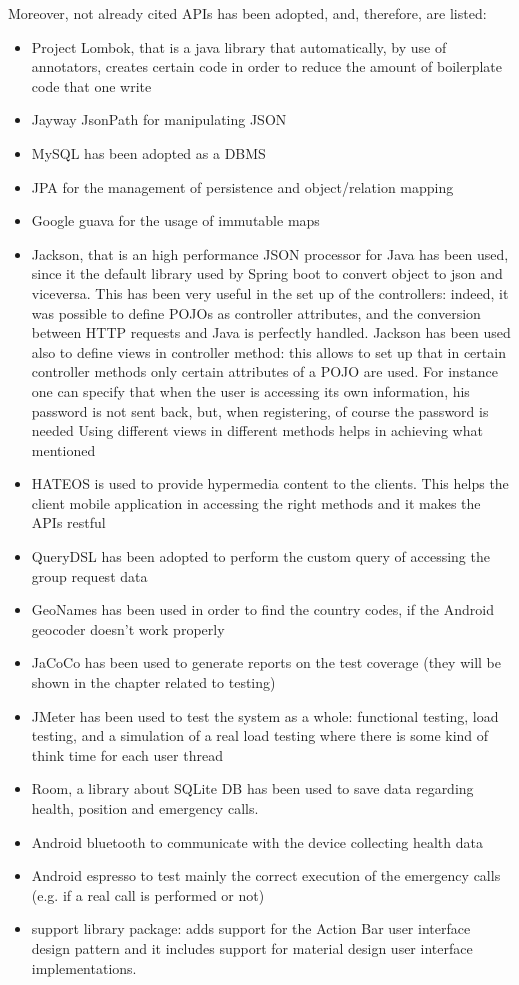 Moreover, not already cited APIs has been adopted, and, therefore, are listed: 

\begin{itemize}
\item Project Lombok, that is a java library that automatically, by use of annotators, creates certain code in order to reduce the amount
of boilerplate code that one write 
\item Jayway JsonPath for manipulating JSON 
\item MySQL has been adopted as a DBMS
\item JPA for the management of persistence and object/relation mapping
\item Google guava for the usage of immutable maps
\item Jackson, that is an high performance JSON processor for Java has been used, since it the default library used by Spring boot 
to convert object to json and viceversa. 
This has been very useful in the set up of the controllers: indeed, it was possible to define POJOs as controller attributes, and the conversion between HTTP requests and Java is perfectly handled. 
Jackson has been used also to define views in controller method: this allows to set up that in certain controller methods only certain attributes of a POJO are used. 
For instance one can specify that when the user is accessing its own information, his password is not sent back, but, when registering, of course the password is needed
Using different views in different methods helps in achieving what mentioned 
\item HATEOS is used to provide hypermedia content to the clients. This helps the client mobile application in accessing the right methods 
and it makes the APIs restful
\item QueryDSL has been adopted to perform the custom query of accessing the group request data
\item GeoNames has been used in order to find the country codes, if the Android geocoder doesn't work properly
\item JaCoCo has been used to generate reports on the test coverage (they will be shown in the chapter related to testing)
\item JMeter has been used to test the system as a whole: functional testing, load testing, and a simulation of a real load testing where there is some kind of think time for each user thread
\item Room, a library about SQLite DB has been used to save data regarding health, position and emergency calls.
\item Android bluetooth to communicate with the device collecting health data
\item Android espresso to test mainly the correct execution of the emergency calls (e.g. if a real call is performed or not)
\item support library package: adds support for the Action Bar user interface design pattern and it includes support for material design user interface implementations. 
\end{itemize}
